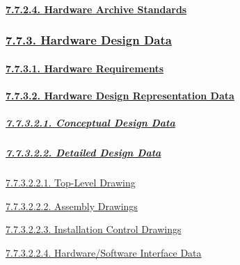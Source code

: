 \documentclass[
]{article}
\begin{document}
\hypertarget{hardware-archive-standards}{%
\paragraph{\texorpdfstring{\protect\hyperlink{hardware-archive-standards-1}{7.7.2.4.
Hardware Archive
Standards}}{7.7.2.4. Hardware Archive Standards}}\label{hardware-archive-standards}}

\hypertarget{hardware-design-data}{%
\subsubsection{\texorpdfstring{\protect\hyperlink{hardware-design-data-1}{7.7.3.
Hardware Design
Data}}{7.7.3. Hardware Design Data}}\label{hardware-design-data}}

\hypertarget{hardware-requirements}{%
\paragraph{\texorpdfstring{\protect\hyperlink{hardware-requirements-1}{7.7.3.1.
Hardware
Requirements}}{7.7.3.1. Hardware Requirements}}\label{hardware-requirements}}

\hypertarget{hardware-design-representation-data}{%
\paragraph{\texorpdfstring{\protect\hyperlink{hardware-design-representation-data-1}{7.7.3.2.
Hardware Design Representation
Data}}{7.7.3.2. Hardware Design Representation Data}}\label{hardware-design-representation-data}}

\hypertarget{conceptual-design-data}{%
\subparagraph{\texorpdfstring{\protect\hyperlink{conceptual-design-data-1}{7.7.3.2.1.
Conceptual Design
Data}}{7.7.3.2.1. Conceptual Design Data}}\label{conceptual-design-data}}

\hypertarget{detailed-design-data}{%
\subparagraph{\texorpdfstring{\protect\hyperlink{detailed-design-data-1}{7.7.3.2.2.
Detailed Design
Data}}{7.7.3.2.2. Detailed Design Data}}\label{detailed-design-data}}

\protect\hyperlink{top-level-drawing-1}{7.7.3.2.2.1. Top-Level Drawing}

\protect\hyperlink{assembly-drawings-1}{7.7.3.2.2.2. Assembly Drawings}

\protect\hyperlink{installation-control-drawings-1}{7.7.3.2.2.3.
Installation Control Drawings}

\protect\hyperlink{hardwaresoftware-interface-data-1}{7.7.3.2.2.4.
Hardware/Software Interface Data}
\end{document}
